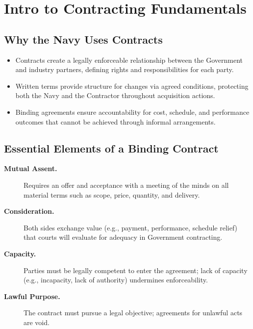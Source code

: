 \documentclass[../main.tex]{subfiles}
\begin{document}

\section{Intro to Contracting Fundamentals}
\minibib
\subsection{Why the Navy Uses Contracts}
\begin{itemize}
	\item Contracts create a legally enforceable relationship between the Government and industry partners, defining rights and responsibilities for each party.
	\item Written terms provide structure for changes via agreed conditions, protecting both the Navy and the Contractor throughout acquisition actions.
	\item Binding agreements ensure accountability for cost, schedule, and performance outcomes that cannot be achieved through informal arrangements.
\end{itemize}

\subsection{Essential Elements of a Binding Contract}
\begin{description}
	\item[\textbf{Mutual Assent.}] Requires an offer and acceptance with a meeting of the minds on all material terms such as scope, price, quantity, and delivery.
	\item[\textbf{Consideration.}] Both sides exchange value (e.g., payment, performance, schedule relief) that courts will evaluate for adequacy in Government contracting.
	\item[\textbf{Capacity.}] Parties must be legally competent to enter the agreement; lack of capacity (e.g., incapacity, lack of authority) undermines enforceability.
	\item[\textbf{Lawful Purpose.}] The contract must pursue a legal objective; agreements for unlawful acts are void.
\end{description}
\end{document}
